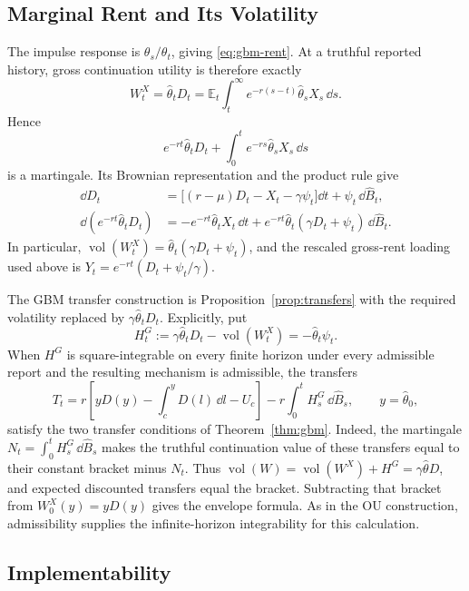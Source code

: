 \documentclass[12pt]{article}
\DeclareMathOperator{\vol}{vol}
\newcommand{\E}{\mathbb{E}}
\newcommand{\hth}{\hat\theta}
\newcommand{\hB}{\hat B}
\begin{document}
\subsection{Marginal Rent and Its Volatility}
\label{app:gbm-rent}

The impulse response is \(\theta_s/\theta_t\), giving
\eqref{eq:gbm-rent}. At a truthful reported history, gross continuation
utility is therefore exactly
\begin{equation}\label{eq:gbm-gross-rent}
  W_t^X=\hth_tD_t
    =\E_t\int_t^\infty e^{-r(s-t)}\hth_sX_s\,\dd s.
\end{equation}
Hence
\[
  e^{-rt}\hth_tD_t+\int_0^t e^{-rs}\hth_sX_s\,\dd s
\]
is a martingale. Its Brownian representation and the product rule
give
\begin{align}
  \dd D_t
   &=\bigl[(r-\mu)D_t-X_t-\gamma\psi_t\bigr]\dd t
       +\psi_t\,\dd\hB_t,
       \label{eq:gbm-D-dynamics}\\
  \dd(e^{-rt}\hth_tD_t)
   &=-e^{-rt}\hth_tX_t\,\dd t
     +e^{-rt}\hth_t(\gamma D_t+\psi_t)\,\dd\hB_t.
       \label{eq:gbm-product-dynamics}
\end{align}
In particular, \(\vol(W_t^X)=\hth_t(\gamma D_t+\psi_t)\), and
the rescaled gross-rent loading used above is
\(Y_t=e^{-rt}(D_t+\psi_t/\gamma)\).

The GBM transfer construction is Proposition~\ref{prop:transfers}
with the required volatility replaced by \(\gamma\hth_tD_t\).
Explicitly, put
\[
  H_t^G:=\gamma\hth_tD_t-\vol(W_t^X)=-\hth_t\psi_t.
\]
When \(H^G\) is square-integrable on every finite horizon under every
admissible report and the resulting mechanism is admissible, the transfers
\begin{equation}\label{eq:gbm-transfers}
  T_t=r\left[yD(y)-\int_c^yD(l)\,\dd l-U_c\right]
      -r\int_0^tH_s^G\,\dd\hB_s,
  \qquad y=\hth_0,
\end{equation}
satisfy the two transfer conditions of Theorem~\ref{thm:gbm}.
Indeed, the martingale \(N_t=\int_0^tH_s^G\,\dd\hB_s\) makes
the truthful continuation value of these transfers equal to their
constant bracket minus \(N_t\). Thus
\(\vol(W)=\vol(W^X)+H^G=\gamma\hth D\), and expected discounted
transfers equal the bracket. Subtracting that bracket from
\(W_0^X(y)=yD(y)\) gives the envelope formula. As in the OU
construction, admissibility supplies the infinite-horizon
integrability for this calculation.

\subsection{Implementability}
\label{app:gbm-implementability}
\end{document}
